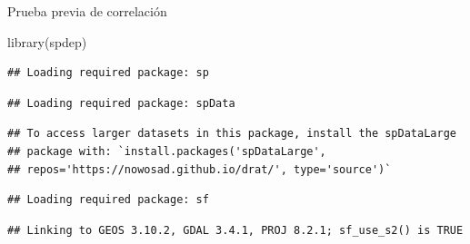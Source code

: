 \documentclass[
  11pt,
  ignorenonframetext,
]{beamer}
\newenvironment{Shaded}{}{}
\newcommand{\AttributeTok}[1]{\textcolor[rgb]{0.49,0.56,0.16}{#1}}
\newcommand{\DecValTok}[1]{\textcolor[rgb]{0.25,0.63,0.44}{#1}}
\newcommand{\FunctionTok}[1]{\textcolor[rgb]{0.02,0.16,0.49}{#1}}
\newcommand{\NormalTok}[1]{#1}
\newcommand{\OtherTok}[1]{\textcolor[rgb]{0.00,0.44,0.13}{#1}}
\newcommand{\SpecialCharTok}[1]{\textcolor[rgb]{0.25,0.44,0.63}{#1}}
\newcommand{\StringTok}[1]{\textcolor[rgb]{0.25,0.44,0.63}{#1}}
\begin{document}
\begin{frame}[fragile]{Prueba previa de correlación}
\protect\hypertarget{prueba-previa-de-correlaciuxf3n}{}
\begin{Shaded}
\begin{Highlighting}[]
\FunctionTok{library}\NormalTok{(spdep)}
\end{Highlighting}
\end{Shaded}

\begin{verbatim}
## Loading required package: sp
\end{verbatim}

\begin{verbatim}
## Loading required package: spData
\end{verbatim}

\begin{verbatim}
## To access larger datasets in this package, install the spDataLarge
## package with: `install.packages('spDataLarge',
## repos='https://nowosad.github.io/drat/', type='source')`
\end{verbatim}

\begin{verbatim}
## Loading required package: sf
\end{verbatim}

\begin{verbatim}
## Linking to GEOS 3.10.2, GDAL 3.4.1, PROJ 8.2.1; sf_use_s2() is TRUE
\end{verbatim}

\begin{Shaded}
\end{Shaded}
\end{frame}
\end{document}
